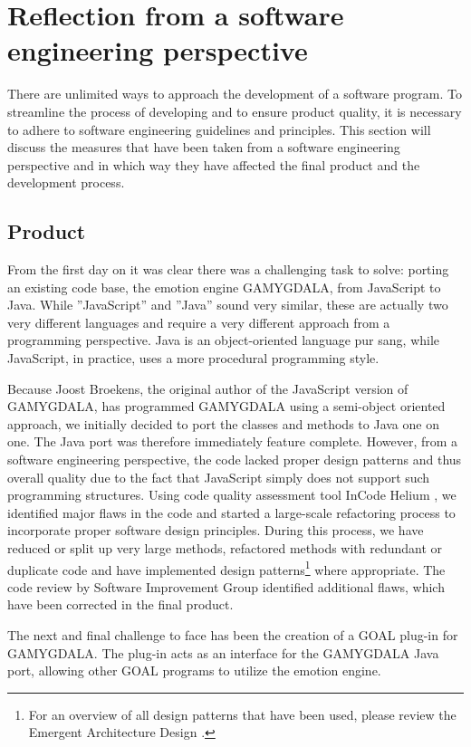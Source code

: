 \section{Reflection from a software engineering perspective}
There are unlimited ways to approach the development of a software program. To streamline the process of developing and to ensure product quality, it is necessary to adhere to software engineering guidelines and principles. This section will discuss the measures that have been taken from a software engineering perspective and in which way they have affected the final product and the development process.


\subsection{Product}
From the first day on it was clear there was a challenging task to solve: porting an existing code base, the emotion engine GAMYGDALA, from JavaScript to Java. While ''JavaScript'' and ''Java'' sound very similar, these are actually two very different languages and require a very different approach from a programming perspective. Java is an object-oriented language pur sang, while JavaScript, in practice, uses a more procedural programming style.

Because Joost Broekens, the original author of the JavaScript version of GAMYGDALA, has programmed GAMYGDALA using a semi-object oriented approach, we initially decided to port the classes and methods to Java one on one. The Java port was therefore immediately feature complete. However, from a software engineering perspective, the code lacked proper design patterns and thus overall quality due to the fact that JavaScript simply does not support such  programming structures. Using code quality assessment tool InCode Helium \citep{incode}, we identified major flaws in the code and started a large-scale refactoring process to incorporate proper software design principles. During this process, we have reduced or split up very large methods, refactored methods with redundant or duplicate code and have implemented design patterns\footnote{For an overview of all design patterns that have been used, please review the Emergent Architecture Design \citep{ead}.} where appropriate. The code review by Software Improvement Group \citep{SIG} identified additional flaws, which have been corrected in the final product.

The next and final challenge to face has been the creation of a GOAL \citep{goal} plug-in for GAMYGDALA. The plug-in acts as an interface for the GAMYGDALA Java port, allowing other GOAL programs to utilize the emotion engine.

